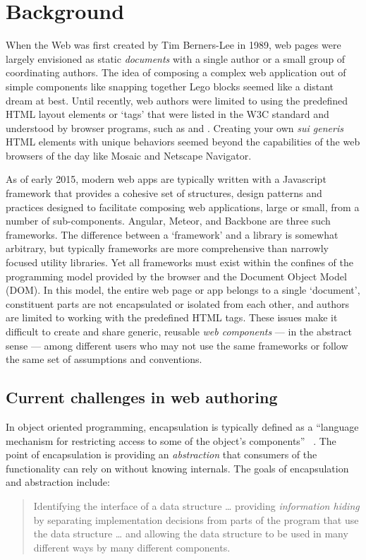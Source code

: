 \chapter{Background}
%

When the Web was first created by Tim Berners-Lee in 1989, web pages were largely envisioned as static \textit{documents} with a single author or a small group of coordinating authors. 
The idea of composing a complex web application out of simple components like snapping together Lego blocks seemed like a distant dream at best.
Until recently, web authors were limited to using the predefined HTML layout elements or `tags' that were listed in the W3C standard and understood by browser programs, such as  and . 
Creating your own \textit{sui generis} HTML elements with unique behaviors seemed beyond the capabilities of the web browsers of the day like Mosaic and Netscape Navigator.

As of early 2015, modern web apps are typically written with a Javascript framework that provides a cohesive set of structures, design patterns and practices designed to facilitate composing web applications, large or small, from a number of sub-components.
Angular, Meteor, and Backbone are three such frameworks.
The difference between a `framework' and a library is somewhat arbitrary, but typically frameworks are more comprehensive than narrowly focused utility libraries.
Yet all frameworks must exist within the confines of the programming model provided by the browser and the Document Object Model (DOM). 
In this model, the entire web page or app belongs to a single `document', constituent parts are not encapsulated or isolated from each other, and authors are limited to working with the predefined HTML tags.
These issues make it difficult to create and share generic, reusable \textit{web components} 
--- in the abstract sense --- 
among different users who may not use the same frameworks or follow the same set of assumptions and conventions.

\section{Current challenges in web authoring}
In object oriented programming, encapsulation is typically defined as a 
``language mechanism for restricting access to some of the object's components''
~\cite[p. 522]{mitchell2003}.
The point of encapsulation is providing an \textit{abstraction} that consumers of the functionality can rely on without knowing internals. 
The goals of encapsulation and abstraction include:
\begin{quote}
Identifying the interface of a data structure \dots 
providing \textit{information hiding} by separating implementation decisions from parts of the program that use the data structure \dots 
and allowing the data structure to be used in many different ways by many different components.
\cite[p. 243]{mitchell2003}
\end{quote}

